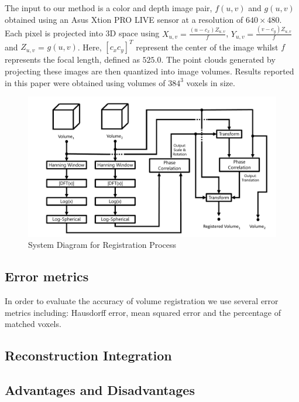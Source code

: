 The input to our method is a color and depth image pair, $f(u,v)$ and $g(u,v)$ obtained using an Asus Xtion PRO LIVE sensor at a resolution of $640 \times 480$. Each pixel is projected into 3D space using $X_{u,v} = \frac{(u - c_x)Z_{u,v}}{f}$, $Y_{u,v} = \frac{(v - c_y)Z_{u,v}}{f}$ and $Z_{u,v}$ = $g(u,v)$. 
Here, $[c_x c_y]^T$ represent the center of the image whilst $f$ represents the focal length, defined as $525.0$. The point clouds generated by projecting these images are then quantized into image volumes. Results reported in this paper were obtained using volumes of $384^3$ voxels in size.

\begin{figure}[t]
\centering
\includegraphics[width=6.0in]{images/ch2/pipeline2}
\caption{System Diagram for Registration Process}
\label{fig:PIPELINE}
\end{figure}


\subsection{Error metrics}

In order to evaluate the accuracy of volume registration we use several error metrics including: Hausdorff error, mean squared error and the percentage of matched voxels. 


\subsection{Reconstruction Integration}

\subsection{Advantages and Disadvantages}

